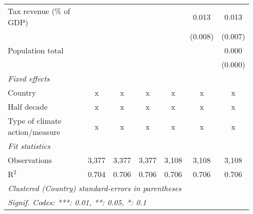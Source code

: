 \begin{tabular}{lcccccc}
   Tax revenue (\% of GDP)                                      &         &                &                &                & 0.013          & 0.013\\   
                                                                &         &                &                &                & (0.008)        & (0.007)\\   
   Population total                                             &         &                &                &                &                & 0.000\\   
                                                                &         &                &                &                &                & (0.000)\\   
   \emph{Fixed effects}\\
   Country                                                      & x       & x              & x              & x              & x              & x\\  
   Half decade                                                  & x       & x              & x              & x              & x              & x\\  
   Type of climate action/measure                               & x       & x              & x              & x              & x              & x\\  
   \midrule \emph{Fit statistics}\\
   Observations                                                 & 3,377   & 3,377          & 3,377          & 3,108          & 3,108          & 3,108\\  
   R$^2$                                                        & 0.704   & 0.706          & 0.706          & 0.706          & 0.706          & 0.706\\  
   \midrule
   \multicolumn{7}{l}{\emph{Clustered (Country) standard-errors in parentheses}}\\
   \multicolumn{7}{l}{\emph{Signif. Codes: ***: 0.01, **: 0.05, *: 0.1}}\\
\end{tabular}
\par\endgroup


